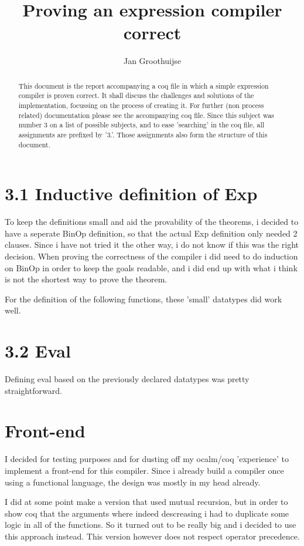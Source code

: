 \documentclass[10pt,a4paper,usenames,dvipnames]{article}
\author{ Jan Groothuijse }
\title{ Proving an expression compiler correct }
\begin{document}
\maketitle
\begin{abstract}
This document is the report accompanying a coq file in which a simple expression compiler is proven correct. 
It shall discuss the challenges and solutions of the implementation, focussing on the process of creating it.
For further (non process related) documentation please see the accompanying coq file. Since this subject was number
3 on a list of possible subjects, and to ease 'searching' in the coq file, all assignments are prefixed by '3.'. 
Those assignments also form the structure of this document.
\end{abstract}

\section*{3.1 Inductive definition of Exp}
To keep the definitions small and aid the provability of the theorems, i decided to have a seperate BinOp definition, so that
the actual Exp definition only needed 2 clauses. Since i have not tried it the other way, i do not know if this was the right
decision. When proving the correctness of the compiler i did need to do induction on BinOp in order to keep the goals readable, and i did end up with what i think is not the shortest way to prove the theorem.

For the definition of the following functions, these 'small' datatypes did work well.

\section*{3.2 Eval }
Defining eval based on the previously declared datatypes was pretty straightforward.

\section*{ Front-end }
I decided for testing purposes and for dusting off my ocalm/coq 'experience' to implement a front-end for this compiler.
Since i already build a compiler once using a functional language, the design was mostly in my head already.

I did at some point make a version that used mutual recursion, but in order to show coq that the arguments where indeed descreasing i had to duplicate some logic in all of the functions. So it turned out to be really big and i decided to use
this approach instead. This version however does not respect operator precedence.
\end{document}
